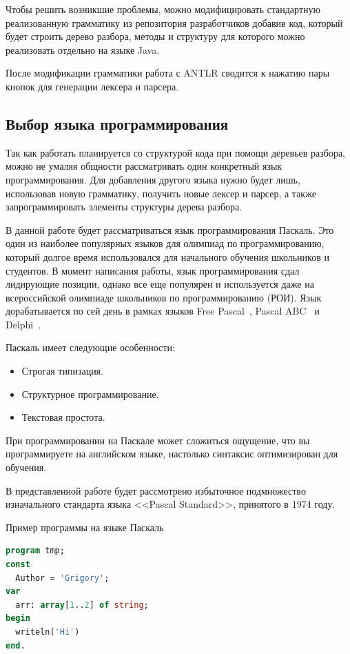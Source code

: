 Чтобы решить возникшие проблемы, можно модифицировать стандартную реализованную грамматику из репозитория разработчиков
добавив код, который будет строить дерево разбора, методы и структуру для которого можно реализовать отдельно на языке
Java.

После модификации грамматики работа с ANTLR сводится к нажатию пары кнопок для генерации лексера и парсера. 

\subsection{Выбор языка программирования}

Так как работать планируется со структурой кода при помощи деревьев разбора, можно не умаляя общности рассматривать один
конкретный язык программирования. Для добавления другого языка нужно будет лишь, использовав новую грамматику, получить новые лексер
и парсер, а также запрограммировать элементы структуры дерева разбора.

В данной работе будет рассматриваться язык программирования Паскаль. Это один из наиболее популярных языков для олимпиад
по программированию, который долгое время использовался для начального обучения школьников и студентов. В момент написания
работы, язык программирования сдал лидирующие позиции, однако все еще популярен и используется даже на всероссийской олимпиаде
школьников по программированию (РОИ). Язык дорабатывается по сей день в рамках языков Free Pascal~\cite{free-pascal}, 
Pascal ABC~\cite{pascal-abc} и Delphi~\cite{delphi}.

Паскаль имеет следующие особенности:
\begin{itemize}
    \item Строгая типизация.
    \item Структурное программирование.
    \item Текстовая простота.
\end{itemize}

При программировании на Паскале может сложиться ощущение, что вы программируете на английском языке, настолько синтаксис оптимизирован
для обучения.

В представленной работе будет рассмотрено избыточное подмножество изначального стандарта языка 
<<Pascal Standard>>, принятого в 1974 году.

\begin{algorithm}[!h] 
\caption{Пример программы на языке Паскаль}\label{lst1} 
\begin{lstlisting}[language=pascal]
program tmp;
const
  Author = 'Grigory';
var
  arr: array[1..2] of string;
begin
  writeln('Hi')
end.
\end{lstlisting} 
\end{algorithm}


